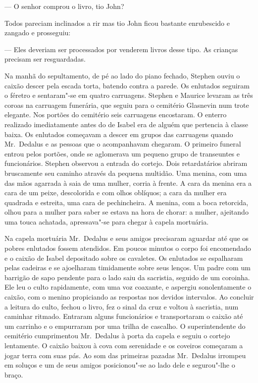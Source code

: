 --- O senhor comprou o livro, tio John?

Todos pareciam inclinados a rir mas tio John ficou bastante enrubescido e
zangado e prosseguiu:

--- Eles deveriam ser processados por venderem livros desse tipo.  As crianças
precisam ser resguardadas.

Na manhã do sepultamento, de pé ao lado do piano fechado, Stephen ouviu o
caixão descer pela escada torta, batendo contra a parede.  Os enlutados
seguiram o féretro e sentaram"-se em quatro carruagens.  Stephen e Maurice
levaram as três coroas na carruagem funerária, que seguiu para o cemitério
Glasnevin num trote elegante.  Nos portões do cemitério seis carruagens
encostaram.  O enterro realizado imediatamente antes do de Isabel era de alguém
que pertencia à classe baixa.  Os enlutados começavam a descer em grupos das
carruagens quando Mr.~Dedalus e as pessoas que o acompanhavam chegaram.  O
primeiro funeral entrou pelos portões, onde se aglomerava um pequeno grupo de
transeuntes e funcionários.  Stephen observou a entrada do cortejo.  Dois
retardatários abriram bruscamente seu caminho através da pequena multidão.
\label{uma"-menina} Uma menina, com uma das mãos agarrada à saia de uma mulher, corria à frente.
A cara da menina era a cara de um peixe, descolorida e com olhos oblíquos; a
cara da mulher era quadrada e estreita, uma cara de pechincheira.  A menina,
com a boca retorcida, olhou para a mulher para saber se estava na hora de
chorar: a mulher, ajeitando uma touca achatada, apressava"-se para chegar à
capela mortuária.

Na capela mortuária Mr.~Dedalus e seus amigos precisaram aguardar até que os
pobres enlutados fossem atendidos.  Em poucos minutos o corpo foi encomendado e
o caixão de Isabel depositado sobre os cavaletes.  Os enlutados se espalharam
pelas cadeiras e se ajoelharam timidamente sobre seus lenços.  Um padre com um
barrigão de sapo pendente para o lado saiu da sacristia, seguido de um
coroinha.  Ele leu o culto rapidamente, com uma voz coaxante, e aspergiu
sonolentamente o caixão, com o menino propiciando as respostas nos devidos
intervalos.  Ao concluir a leitura do culto, fechou o livro, fez o sinal da
cruz e voltou à sacristia, num caminhar ritmado.  Entraram alguns funcionários
e transportaram o caixão até um carrinho e o empurraram por uma trilha de
cascalho.  O superintendente do cemitério cumprimentou Mr.~Dedalus à porta da
capela e seguiu o cortejo lentamente.  O caixão baixou à cova com serenidade e
os coveiros começaram a jogar terra com suas pás.  Ao som das primeiras pazadas
Mr.~Dedalus irrompeu em soluços e um de seus amigos posicionou"-se ao lado dele
e segurou"-lhe o braço.  

